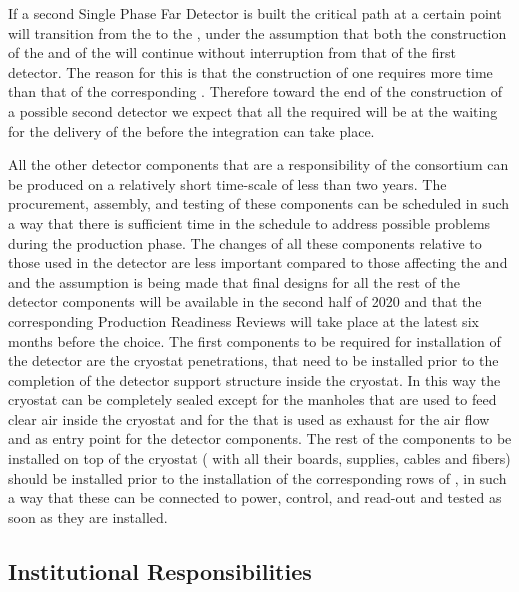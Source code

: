 If a second Single Phase  Far Detector is built the critical
path at a certain point will transition from the 
to the , under the assumption that both the construction
of the  and of the  will continue 
without interruption from that of the first detector. The reason
for this is that the construction of one  requires 
more time than that of the corresponding . Therefore
toward the end of the construction of a possible second detector
we expect that all the required  will be at the
 waiting for the delivery of the  before
the integration can take place.

All the other detector components that are a responsibility of the
 consortium can be produced on a relatively short
time-scale of less than two years. The procurement, assembly, and
testing of these components can be scheduled in such a way that
there is sufficient time in the schedule to address possible 
problems during the production phase. The changes of all these
components relative to those used in the  detector
are less important compared to those affecting the 
and  and the assumption is being made that final
designs for all the rest of the detector components will be 
available in the second half of 2020 and that the corresponding 
Production Readiness Reviews will take place at the latest six months 
before the  choice. The first components to be
required for installation of the detector are the cryostat 
penetrations, that need to be installed prior to the 
completion of the detector support structure inside the cryostat.
In this way the cryostat can be completely sealed except for
the manholes that are used to feed clear air inside the cryostat
and for the  that is used as exhaust for the air flow
and as entry point for the detector components. The rest of the
 components to be installed on top of the 
cryostat ( with all their boards, supplies, cables
and fibers) should be installed prior to the installation of
the corresponding rows of , in such a way that these
can be connected to power, control, and read-out and tested as
soon as they are installed. 

\subsection{Institutional Responsibilities}
\label{sec:fdsp-tpcelec-management-resp}

